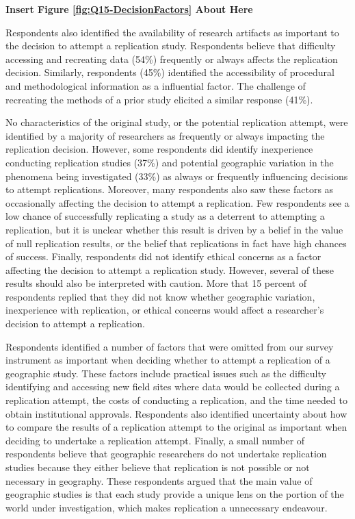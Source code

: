 \documentclass[]{interact}
\theoremstyle{plain}%
\theoremstyle{definition}
\theoremstyle{remark}
\begin{document}
\begin{center}
\textbf{Insert Figure \ref{fig:Q15-DecisionFactors} About Here}
\end{center}

Respondents also identified the availability of research artifacts as important to the decision to attempt a replication study.
Respondents believe that difficulty accessing and recreating data (54\%) frequently or always affects the replication decision.
Similarly, respondents (45\%) identified the accessibility of procedural and methodological information as a influential factor. 
The challenge of recreating the methods of a prior study elicited a similar response (41\%).

No characteristics of the original study, or the potential replication attempt, were identified by a majority of researchers as frequently or always impacting the replication decision. 
However, some respondents did identify inexperience conducting replication studies (37\%) and potential geographic variation in the phenomena being investigated (33\%) as always or frequently influencing decisions to attempt replications. 
Moreover, many respondents also saw these factors as occasionally affecting the decision to attempt a replication.
Few respondents see a low chance of successfully replicating a study as a deterrent to attempting a replication, but it is unclear whether this result is driven by a belief in the value of null replication results, or the belief that replications in fact have high chances of success.
Finally, respondents did not identify ethical concerns as a factor affecting the decision to attempt a replication study. 
However, several of these results should also be interpreted with caution. 
More that 15 percent of respondents replied that they did not know whether geographic variation, inexperience with replication, or ethical concerns would affect a researcher's decision to attempt a replication. 

Respondents identified a number of factors that were omitted from our survey instrument as important when deciding whether to attempt a replication of a geographic study. 
These factors include practical issues such as the difficulty identifying and accessing new field sites where data would be collected during a replication attempt, the costs of conducting a replication, and the time needed to obtain institutional approvals.
Respondents also identified uncertainty about how to compare the results of a replication attempt to the original as important when deciding to undertake a replication attempt. 
Finally, a small number of respondents believe that geographic researchers do not undertake replication studies because they either believe that replication is not possible or not necessary in geography. 
These respondents argued that the main value of geographic studies is that each study provide a unique lens on the portion of the world under investigation, which makes replication a unnecessary endeavour.   
\end{document}
